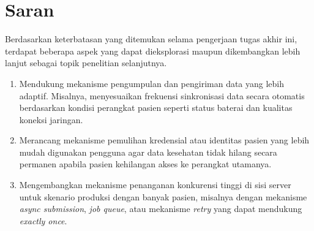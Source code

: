\section{Saran}

Berdasarkan keterbatasan yang ditemukan selama pengerjaan tugas akhir ini,
terdapat beberapa aspek yang dapat dieksplorasi maupun dikembangkan lebih lanjut
sebagai topik penelitian selanjutnya.

\begin{enumerate}
    \item Mendukung mekanisme pengumpulan dan pengiriman data yang lebih adaptif.
    Misalnya, menyesuaikan frekuensi sinkronisasi data secara otomatis berdasarkan
    kondisi perangkat pasien seperti status baterai dan kualitas koneksi jaringan.

    \item Merancang mekanisme pemulihan kredensial atau identitas pasien yang lebih
    mudah digunakan pengguna agar data kesehatan tidak hilang secara permanen
    apabila pasien kehilangan akses ke perangkat utamanya.

    \item Mengembangkan mekanisme penanganan konkurensi tinggi di sisi server untuk
    skenario produksi dengan banyak pasien, misalnya dengan mekanisme
    \emph{async submission}, \emph{job queue}, atau mekanisme \emph{retry} yang
    dapat mendukung \emph{exactly once}.
\end{enumerate}
